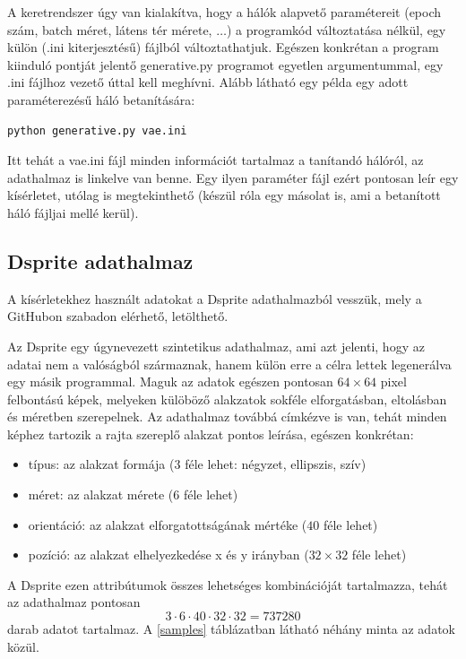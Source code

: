 \documentclass[12pt]{article}
\begin{document}
A keretrendszer úgy van kialakítva, hogy a hálók alapvető paramétereit (epoch szám, batch méret, látens tér mérete, $\dots$) a programkód változtatása nélkül, egy külön (.ini kiterjesztésű) fájlból változtathatjuk. Egészen konkrétan a program kiinduló pontját jelentő generative.py programot egyetlen argumentummal, egy .ini fájlhoz vezető úttal kell meghívni. Alább látható egy példa egy adott paraméterezésű háló betanítására:

\lstset{language=sh}
\begin{lstlisting}
python generative.py vae.ini
\end{lstlisting}

Itt tehát a vae.ini fájl minden információt tartalmaz a tanítandó hálóról, az adathalmaz is linkelve van benne. Egy ilyen paraméter fájl ezért pontosan leír egy kísérletet, utólag is megtekinthető (készül róla egy másolat is, ami a betanított háló fájljai mellé kerül).

\subsection{Dsprite adathalmaz}

A kísérletekhez használt adatokat a Dsprite adathalmazból vesszük, mely a GitHubon szabadon elérhető, letölthető.

Az Dsprite egy úgynevezett szintetikus adathalmaz, ami azt jelenti, hogy az adatai nem a valóságból származnak, hanem külön erre a célra lettek legenerálva egy másik programmal. Maguk az adatok egészen pontosan $64\times64$ pixel felbontású képek, melyeken külöböző alakzatok sokféle elforgatásban, eltolásban és méretben szerepelnek. Az adathalmaz továbbá címkézve is van, tehát minden képhez tartozik a rajta szereplő alakzat pontos leírása, egészen konkrétan:

\begin{itemize}
  \item típus: az alakzat formája ($3$ féle lehet: négyzet, ellipszis, szív)
  \item méret: az alakzat mérete ($6$ féle lehet)
  \item orientáció: az alakzat elforgatottságának mértéke ($40$ féle lehet)
  \item pozíció: az alakzat elhelyezkedése x és y irányban ($32\times32$ féle lehet)
\end{itemize}

A Dsprite ezen attribútumok összes lehetséges kombinációját tartalmazza, tehát az adathalmaz pontosan
$$ 3\cdot6\cdot40\cdot32\cdot32= 737280$$
darab adatot tartalmaz. A \ref{samples} táblázatban látható néhány minta az adatok közül.
\end{document}

